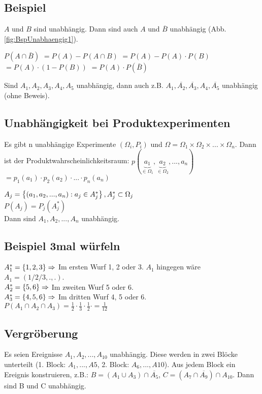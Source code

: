 \renewcommand{\ldate}{2015-11-23}

\subsection{Beispiel}
$A$ und $B$ sind unabhängig. Dann sind auch $A$ und $\overline{B}$ unabhängig (Abb. \ref{fig:BspUnabhaengig1}). 

$P(A\cap \bar B)$
$=P(A) - P(A\cap B)$
$=P(A) - P(A) \cdot P(B)$
$=P(A)\cdot (1-P(B))$
$=P(A)\cdot P(\bar B)$

\begin{satz}
Sind $A_1, A_2, A_3, A_4, A_5$ unabhängig, dann auch z.B. $A_1, \overline{A_2}, \overline{A_3}, A_4, \overline{A_5}$ unabhängig (ohne Beweis).
\end{satz}

\subsection{Unabhängigkeit bei Produktexperimenten}
Es gibt n unabhängige Experimente $(\Omega_i, P_i)$ und $\Omega=\Omega_1 \times \Omega_2 \times ... \times \Omega_n$. Dann ist der Produktwahrscheinlichkeitsraum: 
$p(\underbrace{a_1}_{\in \Omega_1}, \underbrace{a_2}_{\in \Omega_2}, ..., a_n)$
$=p_1(a_1) \cdot p_2(a_2) \cdot ... \cdot p_n(a_n)$

$A_j =  \left\lbrace (a_1,a_2,...,a_n) : a_j \in A_j^* \right\rbrace , A_j^* \subset \Omega_j$\\
$P(A_j) = P_j(A_j^*)$\\
Dann sind $A_1, A_2, ..., A_n$ unabhängig. 

\subsection{Beispiel 3mal würfeln}
$A_1^* =  \left\lbrace 1,2,3 \right\rbrace  \Rightarrow$ Im ersten Wurf 1, 2 oder 3. $A_1$ hingegen wäre $A_1 = (1/2/3, . , . )$.\\
$A_2^* =  \left\lbrace 5,6 \right\rbrace  \Rightarrow$ Im zweiten Wurf 5 oder 6.\\
$A_3^* =  \left\lbrace 4,5,6 \right\rbrace  \Rightarrow$ Im dritten Wurf 4, 5 oder 6.  \\
$P(A_1\cap A_2\cap A_3) = \frac{1}{2} \cdot \frac{1}{3} \cdot \frac{1}{2} \cdot = \frac{1}{12}$ 

\subsection{Vergröberung}
Es seien Ereignisse $A_1, A_2, ..., A_{10}$ unabhängig. Diese werden in zwei Blöcke unterteilt (1. Block: $A_1,...,A5$, 2. Block: $A_6,...,A10$). Aus jedem Block ein Ereignis konstruieren, z.B.: 
$B=(A_1\cup A_3) \cap \overline{A_5}$, $C=(A_7\cap \overline{A_9}) \cap A_{10}$. Dann sind B und C unabhängig. 

